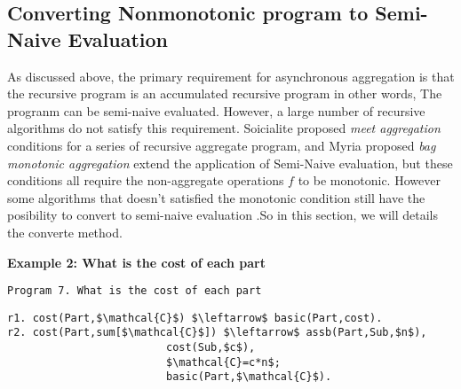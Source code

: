 

\subsection{Converting Nonmonotonic program to Semi-Naive Evaluation}
\label{sec:async:convert}
\begin{comment}
<<<<<<< HEAD
Some non-monotonic computations cannot be written as accumulated recursive program and are not originally qualified for asynchronous aggregation. For example, the PageRank computation cannot be executed as an accumulated recursive program since the monotonic condition is not satisfied. After applying $F\circ G$ operations, the recursion result $X^{k}$ is replaced by $X^{k+1}$ but not contained in $X^{k+1}$. In other words, there is no incremental computing relationship between $X^k$ and $X^{k-1}$. Further, the aggregate operation $g(\{x_i\})=\sum_i{x_i}+0.15$ does not have the accumulative property due to the additional constant $0.15$.

Fortunately, Some of these computations can be converted to accumulative recursive aggregation.The key of the conversion is to incrementally computing the original problem $X^k=(G\circ F)^n(X^0)$ and iteratively computing the incremental value $\Delta X^k$ of each recursion using normal recursive aggregation. i.e.,
=======
\end{comment}

As discussed above, the primary requirement for asynchronous aggregation is that the recursive program is an accumulated recursive program {\color{red} in other words,  The progranm can be semi-naive evaluated}. However, a large number of recursive algorithms do not satisfy this requirement. {\color{red} Soicialite proposed \emph{meet aggregation} conditions for a series of recursive aggregate program, and Myria proposed \emph{bag monotonic aggregation} extend the application of Semi-Naive evaluation, but these conditions all require the non-aggregate operations $f$ to be monotonic. However some algorithms that doesn't satisfied the monotonic condition still have the posibility to convert to semi-naive evaluation }.So in this section, we will details the converte method.


\textbf{Example 2: What is the cost of each part}
 \begin{verbatim}
Program 7. What is the cost of each part
\end{verbatim}
\vspace{-0.1in}\small
\begin{lstlisting}
r1. cost(Part,$\mathcal{C}$) $\leftarrow$ basic(Part,cost).
r2. cost(Part,sum[$\mathcal{C}$]) $\leftarrow$ assb(Part,Sub,$n$),
                         cost(Sub,$c$),
                         $\mathcal{C}=c*n$;
                         basic(Part,$\mathcal{C}$).
\end{lstlisting}
\normalsize



